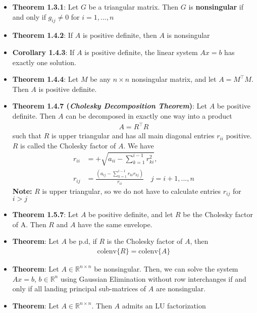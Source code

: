 \documentclass{report}
\begin{document}
\begin{itemize}
\begin{enumerate}[label=(\alph*)]
            \end{enumerate}
        \item \textbf{Theorem 1.3.1}: Let $G$ be a triangular matrix. Then $G$ is \textbf{nonsingular} if and only if
            $g_{ij} \ne 0$ for $i=1,...,n $
        \item \textbf{Theorem 1.4.2}: If $A$ is positive definite, then $A$ is nonsingular
        \item \textbf{Corollary 1.4.3}: If $A$ is positive definite, the linear system $Ax = b$ has exactly one solution.
        \item \textbf{Theorem 1.4.4}: Let $M$ be any $n \times n$ nonsingular matrix, and let $A = M^{\top}M$. Then $A$ is positive definite.
        \item \textbf{Theorem 1.4.7 (\textit{Cholesky Decomposition Theorem})}: Let $A$ be positive definite. Then $A$ can be decomposed in exactly one way into a product
            \begin{align*}
                A = R^{\top}R
            \end{align*}
            such that $R$ is upper triangular and has all main diagonal entries $r_{ii}$ positive. $R$ is called the Cholesky factor of $A$.
            \bigbreak \noindent 
            We have
            \begin{align*}
                r_{ii} &= +\sqrt{a_{ii} - \sum_{k=1}^{i-1}r_{ki}^{2}}, \\
                r_{ij} &= \frac{\left(a_{ij} - \sum_{k=1}^{i-1}r_{ki}r_{kj}\right)}{r_{ii}} \quad j=i+1,...,n
            \end{align*}
            \textbf{Note:} $R$ is upper triangular, so we do not have to calculate entries $r_{ij}$ for $i > j $
        \item \textbf{Theorem 1.5.7}: Let $A$ be positive definite, and let $R$ be the Cholesky factor of A. Then $R$ and $A$ have the same envelope.
        \item \textbf{Theorem}: Let $A$ be p.d, if $R$ is the Cholesky factor of $A$, then
            \begin{align*}
                \text{colenv}\{R\}  = \text{colenv}\{A\}
            \end{align*}
    \item \textbf{Theorem}: Let $A \in \mathbb{R}^{n\times n}$ be nonsingular. Then, we can solve the system $Ax = b$, $b \in \mathbb{R}^{n}$ using Gaussian Elimination without row interchanges if and only if all landing principal sub-matrices of $A$ are nonsingular.
    \item \textbf{Theorem}: Let $A \in \mathbb{R}^{n \times n}$. Then $A$ admits an LU factorization

\end{itemize}
\end{document}
